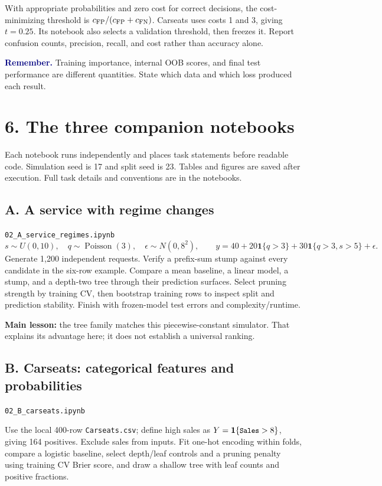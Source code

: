 \documentclass[11pt,a4paper]{article}
\newcommand{\code}[1]{\texttt{\small #1}}
\newcommand{\idea}[1]{\textcolor{navy}{\textbf{Remember.}} #1}
\begin{document}
With appropriate probabilities and zero cost for correct decisions, the
cost-minimizing threshold is $c_{\rm FP}/(c_{\rm FP}+c_{\rm FN})$.
Carseats uses costs 1 and 3, giving $t=0.25$. Its notebook also selects a
validation threshold, then freezes it. Report confusion counts, precision,
recall, and cost rather than accuracy alone.

\idea{Training importance, internal OOB scores, and final test performance are
different quantities. State which data and which loss produced each result.}

\newpage
\section*{6. The three companion notebooks}
Each notebook runs independently and places task statements before readable code.
Simulation seed is 17 and split seed is 23. Tables and figures are saved after
execution. Full task details and conventions are in the notebooks.

\subsection*{A. A service with regime changes}
\code{02\_A\_service\_regimes.ipynb}
\[
s\sim U(0,10),\quad q\sim\operatorname{Poisson}(3),\quad
\epsilon\sim N(0,8^2),\qquad
y=40+20\mathbf1\{q>3\}+30\mathbf1\{q>3,s>5\}+\epsilon.
\]
Generate 1,200 independent requests. Verify a prefix-sum stump against every
candidate in the six-row example. Compare a mean baseline, a linear model,
a stump, and a depth-two tree through their prediction surfaces. Select pruning
strength by training CV, then bootstrap training rows to inspect split and
prediction stability. Finish with frozen-model test errors and complexity/runtime.

\textbf{Main lesson:} the tree family matches this piecewise-constant simulator.
That explains its advantage here; it does not establish a universal ranking.

\subsection*{B. Carseats: categorical features and probabilities}
\code{02\_B\_carseats.ipynb}

Use the local 400-row \code{Carseats.csv}; define high sales as
$Y=\mathbf1\{\code{Sales}>8\}$, giving 164 positives. Exclude sales from
inputs. Fit one-hot encoding within folds, compare a logistic baseline, select
depth/leaf controls and a pruning penalty using training CV Brier score, and
draw a shallow tree with leaf counts and positive fractions.
\end{document}

